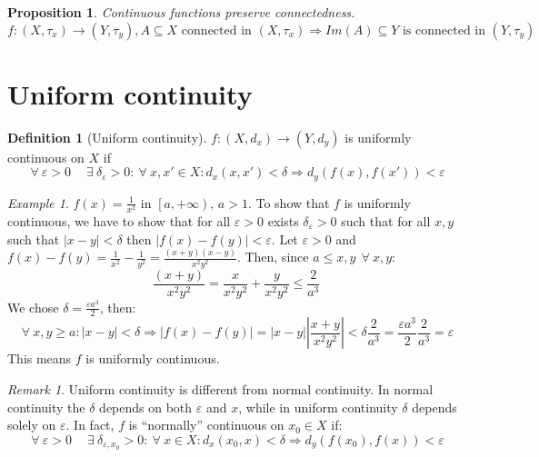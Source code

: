 \documentclass{article}
\newcommand{\abs}[1]{\left|#1\right|}
\newcommand{\Ar}{\Rightarrow}
\newcommand{\fr}[2]{\frac{#1}{#2}}
\newcommand{\f}[3]{#1 : #2 \rightarrow #3}
\theoremstyle{definition}
\newtheorem{definition}{Definition}[section]
\theoremstyle{definition}
\theoremstyle{plain}
\theoremstyle{plain}
\theoremstyle{plain}
\theoremstyle{plain}
\newtheorem{proposition}[theorem]{Proposition}
\theoremstyle{definition}
\theoremstyle{remark}
\newtheorem{exampled}{Example}[definition]
\theoremstyle{remark}
\theoremstyle{remark}
\theoremstyle{remark}
\newtheorem*{remark}{Remark}
\newcommand{\ForAll}{\ \forall \ }
\newcommand{\Exists}{\ \exists \ }
\newcommand{\E}{\varepsilon}
\begin{document}
\begin{proposition}
  Continuous functions preserve connectedness.\\
  \[
  \f{f}{(X,\tau_x)}{(Y,\tau_y)}, A \subseteq X \text{ connected in } (X,\tau_x) \Ar Im(A) \subseteq Y \text{ is connected in } (Y,\tau_y)
  \]
\end{proposition}



\section{Uniform continuity}


\begin{definition}[Uniform continuity]
  $\f{f}{(X,d_x)}{(Y,d_y)}$ is uniformly continuous on $X$ if
  \[
  \ForAll \E > 0 \quad \Exists \delta_\E > 0 : \ForAll x,x' \in X : d_x(x,x')
  < \delta \Ar d_y(f(x),f(x')) < \E
  \]
\end{definition}

\begin{exampled}
  $f(x) = \fr{1}{x^2}$ in $\left[a, +\infty\right)$, $a > 1$. To show that $f$ is uniformly continuous, we have to show that for all $\E > 0$ exists $\delta_\E > 0$ such that for all $x,y$ such that $\abs{x-y} < \delta$ then $\abs{f(x)-f(y)} < \E$. Let $\E > 0$ and $f(x) - f(y) = \fr{1}{x^2} - \fr{1}{y^2} = \fr{(x+y)(x-y)}{x^2 y^2}$. Then, since $a \leq x,y \ \ForAll x,y$:
    \[
    \fr{(x+y)}{x^2 y^2} = \fr{x}{x^2 y^2} + \fr{y}{x^2 y^2} \leq \fr{2}{a^3}
    \]
    We chose $\delta = \fr{\E a^3}{2}$, then:
    \[
    \ForAll x,y \geq a : \abs{x-y} < \delta \Ar \abs{f(x)-f(y)} =
    \abs{x-y} \abs{\fr{x+y}{x^2 y^2}} < \delta \fr{2}{a^3} =
    \fr{\E a^3}{2} \fr{2}{a^3} = \E
    \]
    This means $f$ is uniformly continuous.
\end{exampled}

\begin{remark}
  Uniform continuity is different from normal continuity. In normal continuity the $\delta$ depends on both $\E$ and $x$, while in uniform continuity $\delta$ depends solely on $\E$. In fact, $f$ is ``normally'' continuous on $x_0 \in X$ if:
  \[
  \ForAll \E > 0 \quad \Exists \delta_{\E,x_0} > 0 : \ForAll x \in X :
  d_x(x_0,x) < \delta \Ar d_y(f(x_0),f(x)) < \E
  \]
\end{remark}
\end{document}
